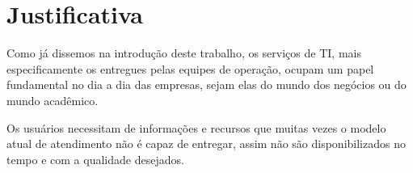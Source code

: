 \documentclass[quali]{mpit}
\begin{document}
\section{Justificativa}

Como já dissemos na introdução deste trabalho, os serviços de TI, mais especificamente os entregues pelas equipes de operação, ocupam um papel fundamental no dia a dia das empresas, sejam elas do mundo dos negócios ou do mundo acadêmico.

Os usuários necessitam de informações e recursos  que muitas vezes o modelo atual de atendimento não é capaz de entregar, assim não são disponibilizados no tempo e com a qualidade desejados.
\end{document}
